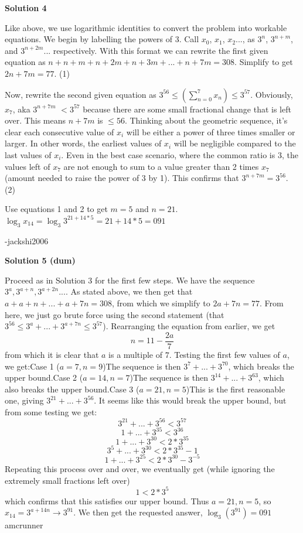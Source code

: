 \begin{enumerate}
 



\textbf{Solution 4}

Like above, we use logarithmic identities to convert the problem into workable equations. We begin by labelling the powers of 3. Call $x_0$, $x_1$, $x_2$..., as $3^n$, $3^{n+m}$, and $3^{n+2m}$... respectively. With this format we can rewrite the first given equation as $n + n + m + n+2m + n+3m+...+n+7m = 308$. Simplify to get $2n+7m=77$. (1)

 Now, rewrite the second given equation as $3^{56} \leq \left( \sum_{n=0}^{7}x_{n} \right) \leq 3^{57}$. Obviously, $x_7$, aka $3^{n+7m}$ $<3^{57}$ because there are some small fractional change that is left over. This means $n+7m$ is $\leq56$. Thinking about the geometric sequence, it's clear each consecutive value of $x_i$ will be either a power of three times smaller or larger. In other words, the earliest values of $x_i$ will be negligible compared to the last values of $x_i$. Even in the best case scenario, where the common ratio is 3, the values left of $x_7$ are not enough to sum to a value greater than 2 times $x_7$ (amount needed to raise the power of 3 by 1). This confirms that $3^{n+7m} = 3^{56}$. (2)

 Use equations 1 and 2 to get $m=5$ and $n=21$. $\log_{3}{x_{14}} = \log_{3}{3^{21+14*5}} = 21+14*5 = \boxed{091}$

 
-jackshi2006

 



\textbf{Solution 5 (dum)}

Proceed as in Solution 3 for the first few steps. We have the sequence $3^{a},3^{a+n},3^{a+2n}...$. As stated above, we then get that $a+a+n+...+a+7n=308$, from which we simplify to $2a+7n=77$. From here, we just go brute force using the second statement (that $3^{56}\leq 3^{a}+...+3^{a+7n}\leq 3^{57}$). Rearranging the equation from earlier, we get
 \[n=11-\frac{2a}{7}\]from which it is clear that $a$ is a multiple of $7$. Testing the first few values of $a$, we get:Case 1 ($a=7,n=9$)The sequence is then $3^{7}+...+3^{70}$, which breaks the upper bound.Case 2 ($a=14,n=7$)The sequence is then $3^{14}+...+3^{63}$, which also breaks the upper bound.Case 3 ($a=21,n=5$)This is the first reasonable one, giving $3^{21}+...+3^{56}$. It seems like this would break the upper bound, but from some testing we get:
 \[3^{21}+...+3^{56}<3^{57}\]
 \[1+...+3^{35}<3^{36}\]
 \[1+...+3^{30}<2*3^{35}\]
 \[3^{5}+...+3^{30}<2*3^{35}-1\]
 \[1+...+3^{25}<2*3^{30}-3^{-5}\]Repeating this process over and over, we eventually get (while ignoring the extremely small fractions left over)
 \[1<2*3^{5}\]which confirms that this satisfies our upper bound. Thus $a=21,n=5$, so $x_14=3^{a+14n}\rightarrow3^{91}$. We then get the requested answer, $\log_3(3^{91})=\boxed{091}$ ~ amcrunner


\end{enumerate}

